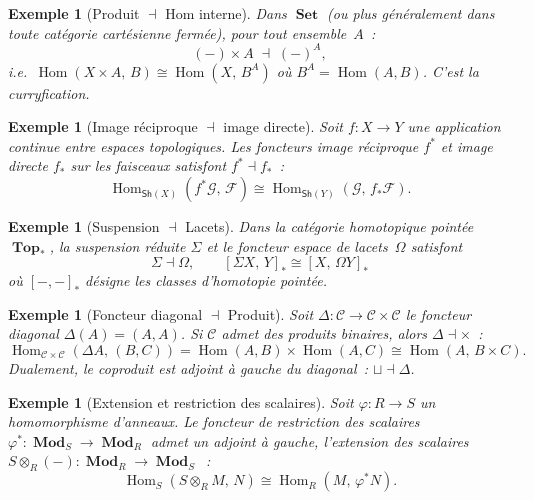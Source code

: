 \documentclass[a4paper,12pt]{book}
\DeclareMathOperator{\Hom}{Hom}
\DeclareMathOperator{\Set}{\mathbf{Set}}
\DeclareMathOperator{\Top}{\mathbf{Top}}
\DeclareMathOperator{\Mod}{\mathbf{Mod}}
\newtheorem{exemple}[theoreme]{Exemple}
\begin{document}
\begin{exemple}[Produit $\dashv$ Hom interne]\label{ex:produit-hom}
Dans $\Set$ (ou plus généralement dans toute catégorie cartésienne fermée),
pour tout ensemble~$A$~:
\[
    (-)\times A \;\dashv\; (-)^A,
\]
i.e.\ $\Hom(X\times A,\, B)\cong\Hom(X,\, B^A)$ où $B^A=\Hom(A,B)$.
C'est la \emph{curryfication}.
\end{exemple}

\begin{exemple}[Image réciproque $\dashv$ image directe]\label{ex:faisceaux}
Soit $f\colon X\to Y$ une application continue entre espaces topologiques.
Les foncteurs image réciproque $f^*$ et image directe $f_*$ sur les
faisceaux satisfont $f^*\dashv f_*$~:
\[
    \Hom_{\mathsf{Sh}(X)}(f^*\mathcal{G},\,\mathcal{F})
    \cong \Hom_{\mathsf{Sh}(Y)}(\mathcal{G},\,f_*\mathcal{F}).
\]
\end{exemple}

\begin{exemple}[Suspension $\dashv$ Lacets]\label{ex:suspension-lacets}
Dans la catégorie homotopique pointée $\Top_*$, la suspension réduite
$\Sigma$ et le foncteur espace de lacets~$\Omega$ satisfont
\[
    \Sigma \dashv \Omega,\qquad
    [\Sigma X,\,Y]_* \cong [X,\,\Omega Y]_*
\]
où $[-,-]_*$ désigne les classes d'homotopie pointée.
\end{exemple}

\begin{exemple}[Foncteur diagonal $\dashv$ Produit]\label{ex:diagonal-produit}
Soit $\Delta\colon\mathcal{C}\to\mathcal{C}\times\mathcal{C}$ le foncteur
diagonal $\Delta(A)=(A,A)$. Si $\mathcal{C}$ admet des produits binaires,
alors $\Delta\dashv\times$~:
\[
    \Hom_{\mathcal{C}\times\mathcal{C}}(\Delta A,\,(B,C))
    = \Hom(A,B)\times\Hom(A,C)
    \cong \Hom(A,\,B\times C).
\]
Dualement, le coproduit est adjoint à gauche du diagonal~:
$\sqcup\dashv\Delta$.
\end{exemple}

\begin{exemple}[Extension et restriction des scalaires]\label{ex:scalaires}
Soit $\varphi\colon R\to S$ un homomorphisme d'anneaux.
Le foncteur de restriction des scalaires $\varphi^*\colon\Mod_S\to\Mod_R$
admet un adjoint à gauche, l'extension des scalaires
$S\otimes_R(-)\colon\Mod_R\to\Mod_S$~:
\[
    \Hom_S(S\otimes_R M,\, N) \cong \Hom_R(M,\,\varphi^* N).
\]
\end{exemple}
\end{document}
